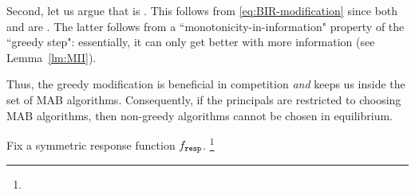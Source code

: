 Second, let us argue that \alg[2] is \bmonotone. This follows from \eqref{eq:BIR-modification} since both \alg[1] and \alggr are \bmonotone. The latter follows from a ``monotonicity-in-information" property of the ``greedy step": essentially, it can only get better with more information
(see Lemma~\ref{lm:MII}).

Thus, the greedy modification is beneficial in competition \emph{and} keeps us inside the set of \bmonotone MAB algorithms. Consequently, if the principals are restricted to choosing \bmonotone MAB algorithms, then non-greedy algorithms cannot be chosen in equilibrium.

\begin{corollary}\label{cor:random-greedy}
Fix a symmetric \HardMaxRandom response function $f_{\mathtt{resp}}$. %
\footnote{}
\end{corollary}




